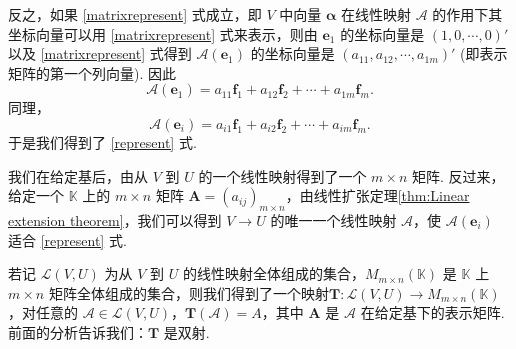 \documentclass[12pt, a4paper,newtx]{ctexart}
\begin{document}
反之，如果 \eqref{matrixrepresent} 式成立，即 $V$ 中向量 $\bm{\alpha}$ 在线性映射 $\mathcal{A}$ 的作用下其坐标向量可以用 \eqref{matrixrepresent} 式来表示，则由 $\bm{e}_1$ 的坐标向量是 $(1, 0, \cdots, 0)'$ 以及 \eqref{matrixrepresent} 式得到 $\mathcal{A}(\bm{e}_1)$ 的坐标向量是 $(a_{11}, a_{12}, \cdots, a_{1m})'$ (即表示矩阵的第一个列向量). 因此
\[
\mathcal{A}(\bm{e}_1) = a_{11}\bm{f}_1 + a_{12}\bm{f}_2 + \cdots + a_{1m}\bm{f}_m.
\]
同理，
\[
\mathcal{A}(\bm{e}_i) = a_{i1}\bm{f}_1 + a_{i2}\bm{f}_2 + \cdots + a_{im}\bm{f}_m.
\]
于是我们得到了 \eqref{represent} 式. 

我们在给定基后，由从 $V$ 到 $U$ 的一个线性映射得到了一个 $m \times n$ 矩阵. 反过来，给定一个 $\mathbb{K}$ 上的 $m \times n$ 矩阵 $\bm A = (a_{ij})_{m\times n}$，由线性扩张定理\ref{thm:Linear extension theorem}，我们可以得到 $V\rightarrow U$ 的唯一一个线性映射 $\mathcal{A}$，使 $\mathcal{A}(\bm{e}_i)$ 适合 \eqref{represent} 式. 

若记 $\mathcal{L}(V, U)$ 为从 $V$ 到 $U$ 的线性映射全体组成的集合，$M_{m \times n}(\mathbb{K})$ 是 $\mathbb{K}$ 上 $m \times n$ 矩阵全体组成的集合，则我们得到了一个映射$\bm T:\mathcal{L}(V, U)\longrightarrow M_{m \times n}(\mathbb{K})$，对任意的 $\mathcal{A} \in \mathcal{L}(V, U)$，$\bm T(\mathcal{A}) = A$，其中 $\bm A$ 是 $\mathcal{A}$ 在给定基下的表示矩阵. 前面的分析告诉我们：$\bm T$ 是双射. 
\end{document}
